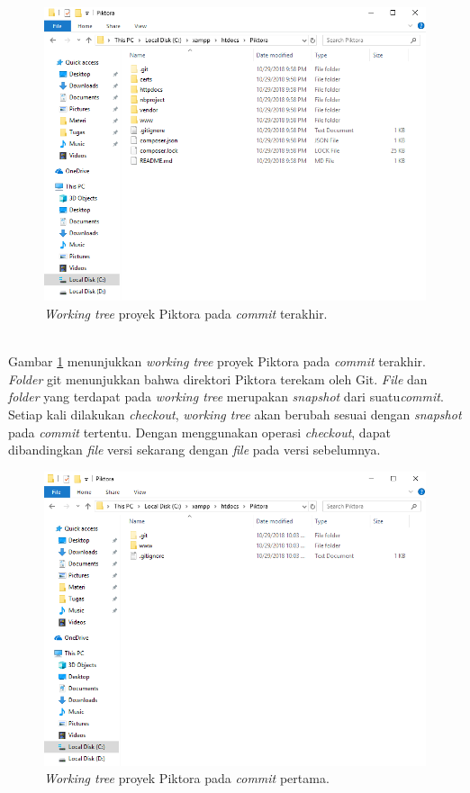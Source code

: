 \begin{figure}[H]
	\centering
		\includegraphics[scale=0.6]{Gambar/piktora_last_commit.png}
	\caption{\textit{Working tree} proyek Piktora pada \textit{commit} terakhir.}
	\label{fig:piktora_last_wt}
\end{figure}
\ \\
Gambar \ref{fig:piktora_last_wt} menunjukkan \textit{working tree} proyek Piktora pada \textit{commit} terakhir. \textit{Folder} git menunjukkan bahwa direktori Piktora terekam oleh Git. \textit{File} dan \textit{folder} yang terdapat pada \textit{working tree} merupakan \textit{snapshot} dari suatu\textit{commit}. Setiap kali dilakukan \textit{checkout}, \textit{working tree} akan berubah sesuai dengan \textit{snapshot} pada \textit{commit} tertentu. Dengan menggunakan operasi \textit{checkout}, dapat dibandingkan \textit{file} versi sekarang dengan \textit{file} pada versi sebelumnya.    
\begin{figure}[H]
	\centering
		\includegraphics[scale=0.6]{Gambar/piktora_first_commit.png}
	\caption{\textit{Working tree} proyek Piktora pada \textit{commit} pertama.}
	\label{fig:piktora_first_wt}
\end{figure}
